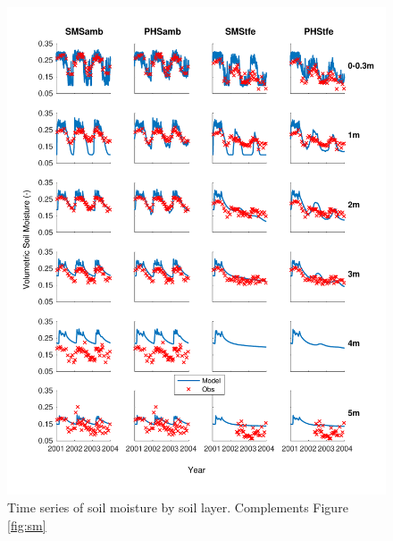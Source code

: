 \documentclass[draft,linenumbers]{agujournal}
\begin{document}
    \begin{figure}[h]
     \centering
     \includegraphics[width=30pc]{../figs3/suppsm2.pdf}
     \caption{Time series of soil moisture by soil layer.
     Complements Figure \ref{fig:sm}}
     \label{supp:sm2}
  \end{figure}
          \clearpage
          
\end{document}
